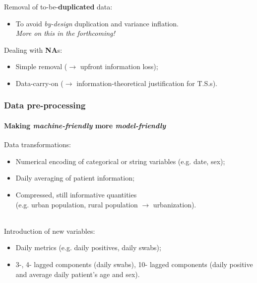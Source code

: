 \documentclass{beamer}
\begin{document}
{\begin{frame}
	\hfill

	Removal of to-be-\textbf{duplicated} data:
	\begin{itemize}
		\item{To avoid \textit{by-design} duplication and variance inflation.\\ \textit{More on this in the forthcoming!}}
	\end{itemize}

	\hfill

	Dealing with \textsf{\textbf{NA}}s:
	\begin{itemize}
		\item{Simple removal ($\rightarrow$ upfront information loss);}
		\item{Data-carry-on ($\rightarrow$ information-theoretical justification for T.S.s).}
	\end{itemize}

\end{frame}

\begin{frame}
	\frametitle{Data pre-processing}
	\framesubtitle{Making \textit{machine-friendly} more \textit{model-friendly}}

	Data transformations:
	\begin{itemize}
		\item Numerical encoding of categorical or string variables (e.g. date, sex);
		\item Daily averaging of patient information;
		\item Compressed, still informative quantities \\ (e.g. urban population, rural population $\rightarrow$ urbanization).
	\end{itemize}
	~\\
	Introduction of new variables:
	\begin{itemize}
		\item Daily metrics (e.g. daily positives, daily swabs);
		\item 3-, 4- lagged components (daily swabs), 10- lagged components (daily positive and average daily patient's age and sex).
	\end{itemize}


\end{frame}}
\end{document}
